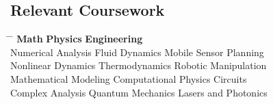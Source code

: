 \documentclass[12pt]{res}
\begin{document}
\begin{resume}
  \section{Relevant Coursework}
    \vspace{-5pt}
    \begin{tabbing}
      \hspace{2.3in} \= \hspace{2.3in} \= \kill
      {\bf Math}         \> {\bf Physics}      \> {\bf Engineering} \\
      Numerical Analysis \> Fluid Dynamics \> Mobile Sensor Planning \\
      Nonlinear Dynamics \> Thermodynamics \> Robotic Manipulation\\ 
      Mathematical Modeling \> Computational Physics \> Circuits  \\
      Complex Analysis \> Quantum Mechanics \> Lasers and Photonics\\
    \end{tabbing}

\end{resume}
\end{document}
